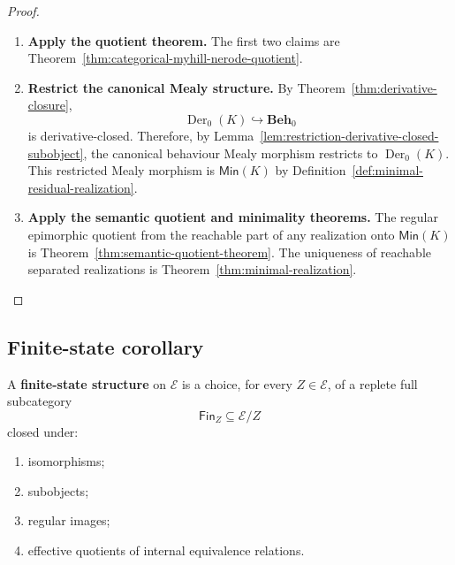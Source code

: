 \begin{proof}
    \leavevmode
    \begin{enumerate}
        \item \textbf{Apply the quotient theorem.} The first two claims are Theorem~\ref{thm:categorical-myhill-nerode-quotient}.

        \item \textbf{Restrict the canonical Mealy structure.} By Theorem~\ref{thm:derivative-closure},
        \[
            \operatorname{Der}_0(K)\hookrightarrow\mathbf{Beh}_0
        \]
        is derivative-closed. Therefore, by Lemma~\ref{lem:restriction-derivative-closed-subobject}, the canonical behaviour Mealy morphism restricts to \(\operatorname{Der}_0(K)\). This restricted Mealy morphism is \(\mathsf{Min}(K)\) by Definition~\ref{def:minimal-residual-realization}.

        \item \textbf{Apply the semantic quotient and minimality theorems.} The regular epimorphic quotient from the reachable part of any realization onto \(\mathsf{Min}(K)\) is Theorem~\ref{thm:semantic-quotient-theorem}. The uniqueness of reachable separated realizations is Theorem~\ref{thm:minimal-realization}.
    \end{enumerate}
\end{proof}

\subsection{Finite-state corollary}
\label{subsec:finite-state-corollary}

\begin{definition}
\label{def:finite-state-doctrine}
    A \textbf{finite-state structure} on \(\mathcal E\) is a choice, for every \(Z\in\mathcal E\), of a replete full subcategory
    \[
        \mathsf{Fin}_Z\subseteq\mathcal E/Z
    \]
    closed under:
    \begin{enumerate}
        \item isomorphisms;

        \item subobjects;

        \item regular images;

        \item effective quotients of internal equivalence relations.
    \end{enumerate}
\end{definition}

